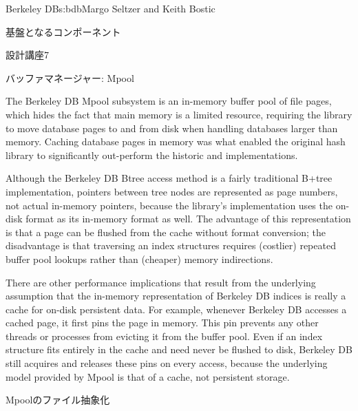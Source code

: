 \begin{aosachapter}{Berkeley DB}{s:bdb}{Margo Seltzer and Keith Bostic}
\begin{aosasect1}{基盤となるコンポーネント}
\begin{aosabox}{設計講座7}
\end{aosabox}

\end{aosasect1}

\begin{aosasect1}{バッファマネージャー: Mpool}

The Berkeley DB Mpool subsystem is an in-memory buffer pool of file
pages, which hides the fact that main memory is a limited resource,
requiring the library to move database pages to and from disk when
handling databases larger than memory. Caching database pages in
memory was what enabled the original hash library to significantly
out-perform the historic  and 
implementations.

Although the Berkeley DB Btree access method is a fairly traditional
B+tree implementation, pointers between tree nodes are represented as
page numbers, not actual in-memory pointers, because the library's
implementation uses the on-disk format as its in-memory format
as well. The advantage of this representation is that a page can be
flushed from the cache without format conversion; the disadvantage is
that traversing an index structures requires (costlier) repeated
buffer pool lookups rather than (cheaper) memory indirections.

There are other performance implications that result from the
underlying assumption that the in-memory representation of Berkeley DB
indices is really a cache for on-disk persistent data. For example,
whenever Berkeley DB accesses a cached page, it first pins the page in
memory. This pin prevents any other threads or processes from 
evicting it from the buffer pool. Even if an index
structure fits entirely in the cache and need never be flushed to
disk, Berkeley DB still acquires and releases these pins on every
access, because the underlying model provided by Mpool is that of a
cache, not persistent storage.

\begin{aosasect2}{Mpoolのファイル抽象化}


\end{aosasect2}
\end{aosasect1}
\end{aosachapter}
